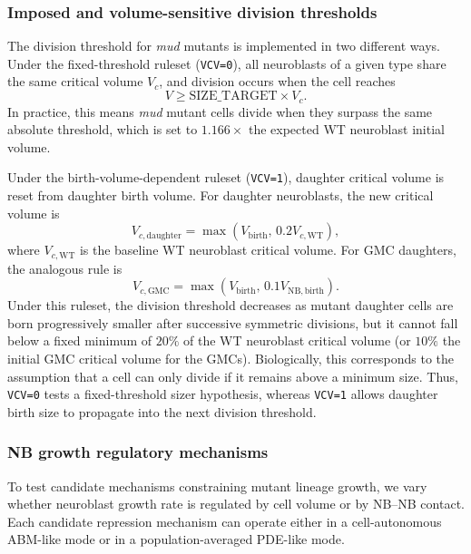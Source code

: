 \subsubsection{Imposed and volume-sensitive division thresholds}
The division threshold for \textit{mud} mutants is implemented in two different ways.
Under the fixed-threshold ruleset (\texttt{VCV=0}), all neuroblasts of a given type share the same critical volume \(V_c\), and division occurs when the cell reaches
\[
V \geq \mathrm{SIZE\_TARGET}\times V_c.
\]
In practice, this means \textit{mud} mutant cells divide when they surpass the same absolute threshold, which is set to \(1.166\times\) the expected WT neuroblast initial volume.

Under the birth-volume-dependent ruleset (\texttt{VCV=1}), daughter critical volume is reset from daughter birth volume.
For daughter neuroblasts, the new critical volume is
\[
V_{c,\mathrm{daughter}} = \max\!\left(V_{\mathrm{birth}},\,0.2V_{c,\mathrm{WT}}\right),
\]
where \(V_{c,\mathrm{WT}}\) is the baseline WT neuroblast critical volume.
For GMC daughters, the analogous rule is
\[
V_{c,\mathrm{GMC}} = \max\!\left(V_{\mathrm{birth}},\,0.1V_{\mathrm{NB,birth}}\right).
\]
Under this ruleset, the division threshold decreases as mutant daughter cells are born progressively smaller after successive symmetric divisions, but it cannot fall below a fixed minimum of \(20\%\) of the WT neuroblast critical volume (or \(10\%\) the initial GMC critical volume for the GMCs).
Biologically, this corresponds to the assumption that a cell can only divide if it remains above a minimum size.
Thus, \texttt{VCV=0} tests a fixed-threshold sizer hypothesis, whereas \texttt{VCV=1} allows daughter birth size to propagate into the next division threshold.

\subsubsection{NB growth regulatory mechanisms}
To test candidate mechanisms constraining mutant lineage growth, we vary whether neuroblast growth rate is regulated by cell volume or by NB--NB contact.
Each candidate repression mechanism can operate either in a cell-autonomous ABM-like mode or in a population-averaged PDE-like mode.

